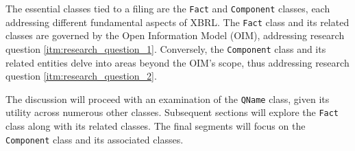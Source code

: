 The essential classes tied to a filing are the \texttt{Fact} and \texttt{Component} classes, each addressing different fundamental aspects of XBRL.
The \texttt{Fact} class and its related classes are governed by the Open Information Model (OIM)\cite{oim}, addressing research question \ref{itm:research_question_1}.
Conversely, the \texttt{Component} class and its related entities delve into areas beyond the OIM's scope, thus addressing research question \ref{itm:research_question_2}.

The discussion will proceed with an examination of the \texttt{QName} class, given its utility across numerous other classes.
Subsequent sections will explore the \texttt{Fact} class along with its related classes.
The final segments will focus on the \texttt{Component} class and its associated classes.




